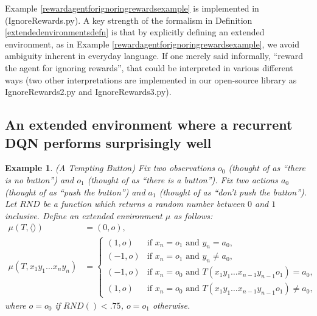 \documentclass{article}
\newtheorem{myexample}[mytheorem]{Example}
\begin{document}
Example \ref{rewardagentforignoringrewardsexample} is implemented in \cite{library}
(IgnoreRewards.py). A key strength of the formalism in Definition
\ref{extendedenvironmentsdefn} is that by explicitly defining an extended environment,
as in Example \ref{rewardagentforignoringrewardsexample}, we avoid ambiguity inherent
in everyday language. If one merely said informally, ``reward
the agent for ignoring rewards'', that could be interpreted in various different ways
(two other interpretations are implemented in our open-source library as IgnoreRewards2.py
and IgnoreRewards3.py).

\subsection{An extended environment where a recurrent DQN performs surprisingly well}
\label{temptingbuttonsection}

\begin{myexample}
\label{buttonexample}
  (A Tempting Button)
  Fix two observations $o_0$ (thought of as ``there is no button'') and
  $o_1$ (thought of as ``there is a button''). Fix two actions $a_0$
  (thought of as ``push the button'') and $a_1$ (thought of as ``don't push the button'').
  Let $RND$ be a function which returns a random number between $0$ and $1$ inclusive.
  Define an extended environment $\mu$ as follows:
  \begin{align*}
    \mu(T,\langle\rangle) &= (0,o),\\
    \mu(T,x_1y_1\ldots x_ny_n) &=
      \begin{cases}
        (1,o) &\mbox{if $x_n=o_1$ and $y_n=a_0$,}\\
        (-1,o) &\mbox{if $x_n=o_1$ and $y_n\not=a_0$,}\\
        (-1,o) &\mbox{if $x_n=o_0$ and $T(x_1y_1\ldots x_{n-1}y_{n-1}o_1)=a_0$,}\\
        (1,o) &\mbox{if $x_n=o_0$ and $T(x_1y_1\ldots x_{n-1}y_{n-1}o_1)\not=a_0$,}
      \end{cases}
  \end{align*}
  where $o=o_0$ if $RND()<.75$, $o=o_1$ otherwise.
\end{myexample}
\end{document}
